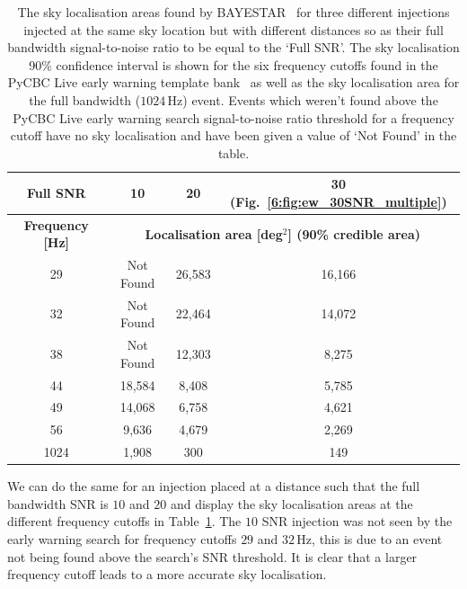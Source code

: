 \begin{table}[ht]
    \centering
    \setlength{\tabcolsep}{4pt}
    \begin{tabular}{cccc}
        \toprule
        \textbf{Full SNR} & \textbf{10} & \textbf{20} & \textbf{30 (Fig.~\ref{6:fig:ew_30SNR_multiple})} \\
        \midrule
        \textbf{Frequency [Hz]} & \multicolumn{3}{c}{\textbf{Localisation area [deg$^{2}$] (90\% credible area) }} \\
        \cmidrule(lr){2-4}
        29 & Not Found & 26,583 & 16,166 \\
        32 & Not Found & 22,464 & 14,072 \\
        38 & Not Found & 12,303 & 8,275 \\
        44 & 18,584 & 8,408 & 5,785 \\
        49 & 14,068 & 6,758 & 4,621 \\
        56 & 9,636 & 4,679 & 2,269 \\
        1024 & 1,908 & 300 & 149 \\
        \bottomrule
    \end{tabular}
    \caption{The sky localisation areas found by BAYESTAR~\cite{BAYESTAR:2016} for three different \gwadj injections injected at the same sky location but with different distances so as their full bandwidth signal-to-noise ratio to be equal to the `Full SNR'. The sky localisation 90\% confidence interval is shown for the six frequency cutoffs found in the PyCBC Live early warning template bank~\cite{PyCBC_earlywarning:2020} as well as the sky localisation area for the full bandwidth ($1024 \, \text{Hz}$) event. Events which weren't found above the PyCBC Live early warning search signal-to-noise ratio threshold for a frequency cutoff have no sky localisation and have been given a value of `Not Found' in the table.}
    \label{6:tab:skymap_early_warning}
\end{table}
%

We can do the same for an injection placed at a distance such that the full bandwidth SNR is $10$ and $20$ and display the sky localisation areas at the different frequency cutoffs in Table~\ref{6:tab:skymap_early_warning}. The $10$ SNR injection was not seen by the early warning search for frequency cutoffs $29$ and $32 \, \text{Hz}$, this is due to an event not being found above the search's SNR threshold. It is clear that a larger frequency cutoff leads to a more accurate sky localisation.

